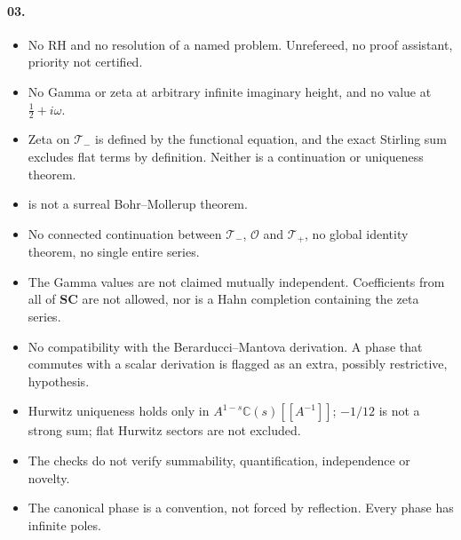 \documentclass[11pt,a4paper]{article}
\numberwithin{equation}{section}
\theoremstyle{definition}
\theoremstyle{remark}
\newcommand{\SC}{\mathbf{SC}}
\newcommand{\C}{\mathbb C}
\newcommand{\OO}{\mathcal O}
\newcommand{\Tp}{\mathcal T_{+}}
\newcommand{\Tm}{\mathcal T_{-}}
\begin{document}
\paragraph{03.}
\begin{itemize}
\item No RH and no resolution of a named problem. Unrefereed, no proof
 assistant, priority not certified.
\item No Gamma or zeta at arbitrary infinite imaginary height, and no value at
 $\tfrac12+i\omega$.
\item Zeta on $\Tm$ is defined by the functional equation, and the exact
 Stirling sum excludes flat terms by definition. Neither is a continuation
 or uniqueness theorem.
\item {} is not a surreal Bohr--Mollerup theorem.
\item No connected continuation between $\Tm$, $\OO$ and $\Tp$, no global
 identity theorem, no single entire series.
\item The Gamma values are not claimed mutually independent. Coefficients from
 all of $\SC$ are not allowed, nor is a Hahn completion containing the zeta
 series.
\item No compatibility with the Berarducci--Mantova derivation. A phase that
 commutes with a scalar derivation is flagged as an extra, possibly
 restrictive, hypothesis.
\item Hurwitz uniqueness holds only in $A^{1-s}\C(s)[[A^{-1}]]$; $-1/12$ is not
 a strong sum; flat Hurwitz sectors are not excluded.
\item The checks do not verify summability, quantification, independence or
 novelty.
\item The canonical phase is a convention, not forced by reflection. Every
 phase has infinite poles.
\end{itemize}
\end{document}
